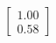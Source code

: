 \documentclass[preview]{standalone}
\begin{document}
\begin{align*}
\begin{bmatrix} 1.00 \\ 0.58 \end{bmatrix}
\end{align*}
\end{document}
